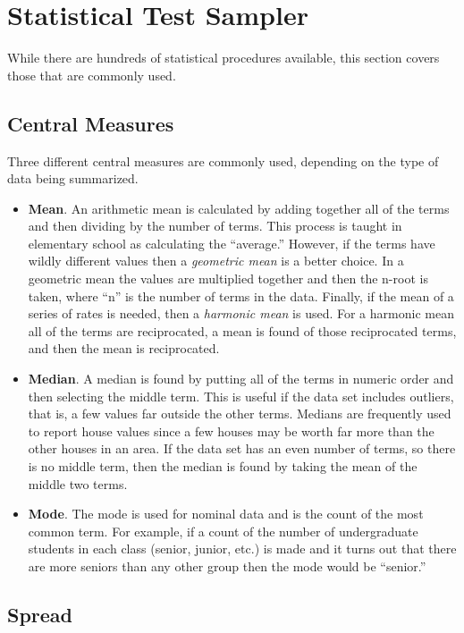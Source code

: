 \section{Statistical Test Sampler}

While there are hundreds of statistical procedures available, this section covers those that are commonly used.

\subsection{Central Measures}

Three different central measures are commonly used, depending on the type of data being summarized.

\begin{itemize}
	\item \textbf{Mean}. An arithmetic mean is calculated by adding together all of the terms and then dividing by the number of terms. This process is taught in elementary school as calculating the ``average.'' However, if the terms have wildly different values then a \textit{geometric mean} is a better choice. In a geometric mean the values are multiplied together and then the n-root is taken, where ``n'' is the number of terms in the data. Finally, if the mean of a series of rates is needed, then a \textit{harmonic mean} is used. For a harmonic mean all of the terms are reciprocated, a mean is found of those reciprocated terms, and then the mean is reciprocated.
	\item \textbf{Median}. A median is found by putting all of the terms in numeric order and then selecting the middle term. This is useful if the data set includes outliers, that is, a few values far outside the other terms. Medians are frequently used to report house values since a few houses may be worth far more than the other houses in an area. If the data set has an even number of terms, so there is no middle term, then the median is found by taking the mean of the middle two terms.
	\item \textbf{Mode}. The mode is used for nominal data and is the count of the most common term. For example, if a count of the number of undergraduate students in each class (senior, junior, etc.) is made and it turns out that there are more seniors than any other group then the mode would be ``senior.''
\end{itemize}

\subsection{Spread}

